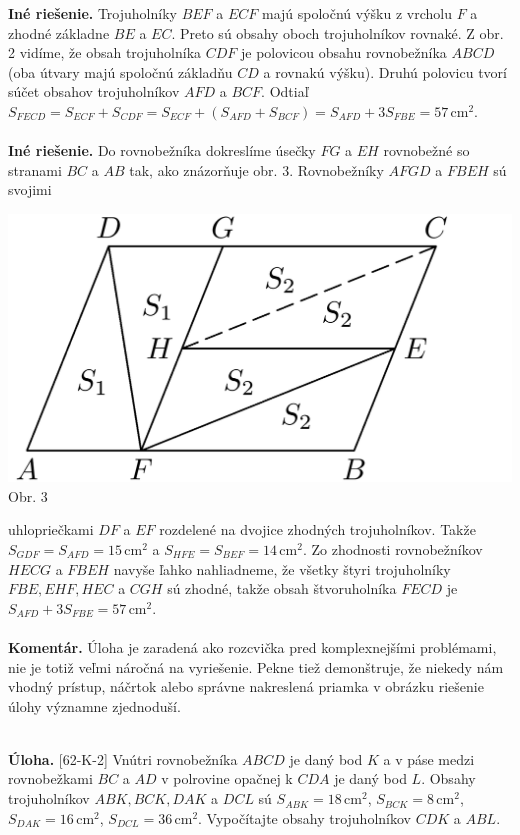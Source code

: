 \documentclass[11pt,a4paper,oneside,final]{book}
\newcommand{\kom}{\textbf{Komentár.} }
\newcommand{\ul}{\textbf{Úloha.} }
\begin{document}
\textbf{Iné riešenie.} Trojuholníky $BEF$ a $ECF$ majú spoločnú výšku z vrcholu $F$ a zhodné základne $BE$ a $EC$. Preto sú obsahy oboch trojuholníkov rovnaké. Z obr. 2 vidíme, že obsah trojuholníka $CDF$ je polovicou obsahu rovnobežníka $ABCD$ (oba útvary majú spoločnú základňu $CD$ a rovnakú výšku). Druhú polovicu tvorí súčet obsahov trojuholníkov $AFD$ a $BCF$. Odtiaľ $S_{FECD} = S_{ECF} + S_{CDF} = S_{ECF} + (S_{AFD} + S_{BCF}) = S_{AFD} + 3 S_{FBE} = 57$\,cm$^2$.\\
\\
\textbf{Iné riešenie.} Do rovnobežníka dokreslíme úsečky $FG$ a $EH$ rovnobežné so stranami $BC$ a $AB$ tak, ako znázorňuje obr. 3. Rovnobežníky $AFGD$ a $FBEH$ sú svojimi
\begin{center}
\includegraphics{57S23}\\

Obr. 3
\end{center}
uhlopriečkami $DF$ a $EF$ rozdelené na dvojice zhodných trojuholníkov. Takže $S_{GDF} = S_{AFD} = 15$\,cm$^2$ a $S_{HFE} = S_{BEF} = 14$\,cm$^2$. Zo zhodnosti rovnobežníkov $HECG$ a $FBEH$ navyše ľahko nahliadneme, že všetky štyri trojuholníky $FBE, EHF, HEC$ a $CGH$ sú zhodné, takže obsah štvoruholníka $FECD$ je $S_{AFD} + 3S_{FBE} = 57$\,cm$^2$.\\
\\
\kom Úloha je zaradená ako rozcvička pred komplexnejšími problémami, nie je totiž veľmi náročná na vyriešenie. Pekne tiež demonštruje, že niekedy nám vhodný prístup, náčrtok alebo správne nakreslená priamka v obrázku riešenie úlohy významne zjednoduší.\\
\\
\begin{tcolorbox}[breakable,notitle,boxrule=0pt,colback=light-gray,colframe=light-gray]\ul [62-K-2] Vnútri rovnobežníka $ABCD$ je daný bod $K$ a v páse medzi rovnobežkami $BC$ a $AD$ v polrovine opačnej k $CDA$ je daný bod $L$. Obsahy trojuholníkov $ABK, BCK, DAK$ a $DCL$ sú $S_{ABK} = 18$\,cm$^2$, $S_{BCK} = 8$\,cm$^2$, $S_{DAK} = 16$\,cm$^2$, $S_{DCL} = 36$\,cm$^2$. Vypočítajte obsahy trojuholníkov $CDK$ a $ABL$.

\end{tcolorbox}
\end{document}
